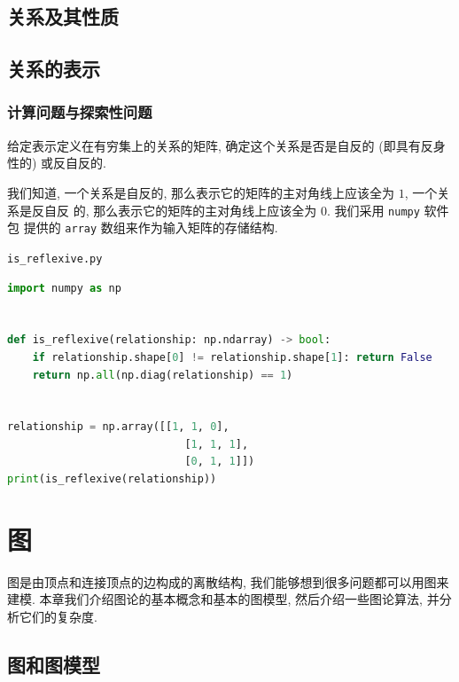 \documentclass[10pt,UTF8]{book} %
\begin{document}
\section{关系及其性质}
\section{关系的表示}
\subsection{计算问题与探索性问题}

\begin{exercise}
    给定表示定义在有穷集上的关系的矩阵, 确定这个关系是否是自反的 (即具有反身性的) 或反自反的.
    \begin{sol}
        我们知道, 一个关系是自反的, 那么表示它的矩阵的主对角线上应该全为 $1$, 一个关系是反自反
        的, 那么表示它的矩阵的主对角线上应该全为 $0$. 我们采用 \lstinline|numpy| 软件包
        提供的 \lstinline|array| 数组来作为输入矩阵的存储结构.
    \end{sol}
    \begin{code} \lstinline|is_reflexive.py|
        \begin{lstlisting}[language=Python]
import numpy as np


def is_reflexive(relationship: np.ndarray) -> bool:
    if relationship.shape[0] != relationship.shape[1]: return False
    return np.all(np.diag(relationship) == 1)

    
relationship = np.array([[1, 1, 0],
                            [1, 1, 1],
                            [0, 1, 1]])
print(is_reflexive(relationship))
        \end{lstlisting}
    \end{code}
\end{exercise}



\newpage
\thispagestyle{empty}

\chapter{图}

图是由顶点和连接顶点的边构成的离散结构, 我们能够想到很多问题都可以用图来建模.
本章我们介绍图论的基本概念和基本的图模型, 然后介绍一些图论算法, 并分析它们的复杂度.

\section{图和图模型}
\end{document}
